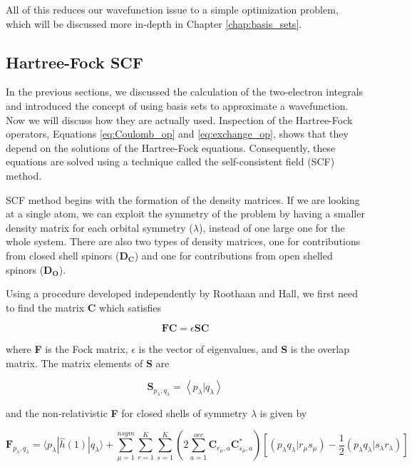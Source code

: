 All of this reduces our wavefunction issue to a simple optimization problem, which will be discussed more in-depth in Chapter \ref{chap:basis_sets}.

\subsection{Hartree-Fock SCF}
In the previous sections, we discussed the calculation of the two-electron integrals and introduced the concept of using basis sets to approximate a wavefunction. Now we will discuss how they are actually used. Inspection of the Hartree-Fock operators, Equations \ref{eq:Coulomb_op} and \ref{eq:exchange_op}, shows that they depend on the solutions of the Hartree-Fock equations. Consequently, these equations are solved using a technique called the self-consistent field (SCF) method.

SCF method begins with the formation of the density matrices. If we are looking at a single atom, we can exploit the symmetry of the problem by having a smaller density matrix for each orbital symmetry ($\lambda$), instead of one large one for the whole system. There are also two types of density matrices, one for contributions from closed shell spinors (\textbf{D$_\textbf{C}$}) and one for contributions from open shelled spinors (\textbf{D$_\textbf{O}$}).

Using a procedure developed independently by Roothaan and Hall\cite{RHF, Hall541}, we first need to find the matrix \textbf{C} which satisfies 

\begin{equation}
\label{RHE}
\textbf{FC} = \epsilon{}\textbf{SC}
\end{equation}

where \textbf{F} is the Fock matrix, $\epsilon$ is the vector of eigenvalues, and \textbf{S} is the overlap matrix. The matrix elements of \textbf{S} are

\begin{equation}
\label{eq:smat}
\textbf{S}_{p_{\lambda}, q_{\lambda}} = \left<p_{\lambda}|q_{\lambda}\right>
\end{equation}

and the non-relativistic \textbf{F} for closed shells of symmetry $\lambda$ is given by

\begin{equation}
\label{FOCKM}
\textbf{F}_{p_{\lambda},q_{\lambda}} = \langle p_{\lambda}|\hat{h}(1)|q_{\lambda}\rangle + \sum^{nsym}_{\mu=1}\sum^{K}_{r=1}\sum^{K}_{s=1}\left( 2\sum^{occ}_{a=1}\textbf{C}_{r_{\mu},a}\textbf{C}^{*}_{s_{\mu}, a}\right)
				\left[\left( p_{\lambda}q_{\lambda}|r_{\mu}s_{\mu}\right) - \frac{1}{2}\left( p_{\lambda}q_{\lambda}|s_{\lambda}r_{\lambda}\right)\right]
\end{equation}

